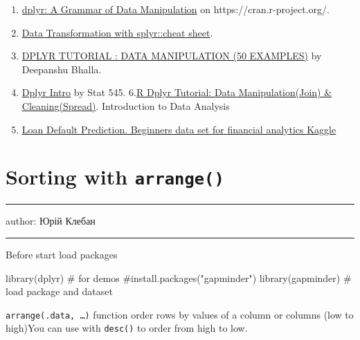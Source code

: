 \documentclass[
  letterpaper,
  DIV=11,
  numbers=noendperiod]{scrreprt}
\newenvironment{Shaded}{\begin{snugshade}}{\end{snugshade}}
\newcommand{\CommentTok}[1]{\textcolor[rgb]{0.37,0.37,0.37}{#1}}
\newcommand{\FunctionTok}[1]{\textcolor[rgb]{0.28,0.35,0.67}{#1}}
\newcommand{\NormalTok}[1]{\textcolor[rgb]{0.00,0.23,0.31}{#1}}
\providecommand{\tightlist}{%
  \setlength{\itemsep}{0pt}\setlength{\parskip}{0pt}}\usepackage{longtable,booktabs,array}
\begin{document}
\begin{enumerate}
\def\labelenumi{\arabic{enumi}.}
\tightlist
\item
  \href{https://cran.r-project.org/web/packages/dplyr/index.html}{dplyr:
  A Grammar of Data Manipulation} on https://cran.r-project.org/.
\item
  \href{https://github.com/rstudio/cheatsheets/blob/master/data-transformation.pdf}{Data
  Transformation with splyr::cheat sheet}.
\item
  \href{https://www.listendata.com/2016/08/dplyr-tutorial.html}{DPLYR
  TUTORIAL : DATA MANIPULATION (50 EXAMPLES)} by Deepanshu Bhalla.
\item
  \href{https://stat545.com/dplyr-intro.html}{Dplyr Intro} by Stat 545.
  6.\href{https://www.guru99.com/r-dplyr-tutorial.html}{R Dplyr
  Tutorial: Data Manipulation(Join) \& Cleaning(Spread)}. Introduction
  to Data Analysis
\item
  \href{https://www.kaggle.com/kmldas/loan-default-prediction}{Loan
  Default Prediction. Beginners data set for financial analytics Kaggle}
\end{enumerate}

\chapter{\texorpdfstring{Sorting with
\textbf{\texttt{arrange()}}}{Sorting with arrange()}}\label{sorting-with-arrange}

\begin{center}\rule{0.5\linewidth}{0.5pt}\end{center}

author: Юрій Клебан

\begin{center}\rule{0.5\linewidth}{0.5pt}\end{center}

Before start load packages

\begin{Shaded}
\begin{Highlighting}[]
\FunctionTok{library}\NormalTok{(dplyr) }\CommentTok{\# for demos}
\CommentTok{\#install.packages("gapminder")}
\FunctionTok{library}\NormalTok{(gapminder)  }\CommentTok{\# load package and dataset}
\end{Highlighting}
\end{Shaded}

\texttt{arrange(.data,\ …)} function order rows by values of a column or
columns (low to high)You can use with \texttt{desc()} to order from high
to low.
\end{document}

